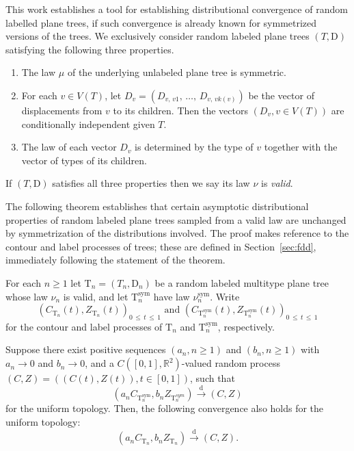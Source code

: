 \documentclass[AHL,Unicode,longabstracts,published]{cedram}
\providecommand{\R}{}
\renewcommand{\R}{\mathbb{R}}
\newcommand{\rD}{\mathrm{D}}
\newcommand{\rT}{\mathrm{T}}
\DeclareMathOperator{\sym}{sym}
\newcommand{\convdist}{\ensuremath{\stackrel{\mathrm{d}}{\rightarrow}}}
\newcommand*{\romanenumi}{\renewcommand*{\theenumi}{\roman{enumi}}}
\newcommand{\R}{\mathbb{R}}
\begin{document}
This work establishes a tool for establishing distributional convergence of random labelled plane trees, if such convergence is already known for symmetrized versions of the trees. We exclusively consider random labeled plane trees $(T,\rD)$ satisfying the following three properties.
\begin{enumerate}\romanenumi
\item \label{1.2.i} The law $\mu$ of the underlying unlabeled plane tree is symmetric.
\item \label{1.2.ii}For each $v \in V(T)$, let $D_v = (D_{v,\,v1},\,\ldots,\,D_{v,\,vk(v)})$ be the vector of displacements from $v$ to its children. Then the vectors $(D_v,v \in V(T))$ are conditionally independent given $T$.
\item \label{1.2.iii}The law of each vector $D_v$ is determined by the type of $v$ together with the vector of types of its children.
\end{enumerate}
If $(T,\rD)$ satisfies all three properties then we say its law $\nu$ is \emph{valid}.

The following theorem establishes that certain asymptotic distributional properties of random labeled plane trees sampled from a valid law are unchanged by symmetrization of the distributions involved. The proof makes reference to the contour and label processes of trees; these are defined in Section~\ref{sec:fdd}, immediately following the statement of the theorem.

\begin{theo}\label{thm:main}
For each $n \ge 1$ let $\rT_n=(T_n,\rD_n)$ be a random labeled multitype plane tree whose law $\nu_n$ is valid, and let $\rT_n^{\sym}$ have law $\nu_n^{\sym}$. Write
\[
\left(C_{\rT_n}(t),Z_{\rT_n}(t)\right)_{0\,\leq\,t\,\leq\,1}\text{ and }\left(C_{\rT_n^{\sym}}(t),Z_{\rT_n^{\sym}}(t)\right)_{0\,\leq\,t\,\leq\, 1}
\]
for the contour and label processes of $\rT_n$ and $\rT_n^{\sym}$, respectively.

Suppose there exist positive sequences $(a_n,n \ge 1)$ and $(b_n,n \ge 1)$ with $a_n \to 0$ and $b_n \to 0$, and a $C([0,1],\R^2)$-valued random process $(C,Z)=((C(t),Z(t)),t \in [0,1])$, such that
\[
\left(a_nC_{\rT_n^{\sym}},b_nZ_{\rT_n^{sym}}\right) \convdist (C,Z)
\]
for the uniform topology. Then, the following convergence also holds for the uniform topology:
\[
\left(a_nC_{\rT_n},b_nZ_{\rT_n}\right) \convdist (C,Z).
\]
\end{theo}
\end{document}
